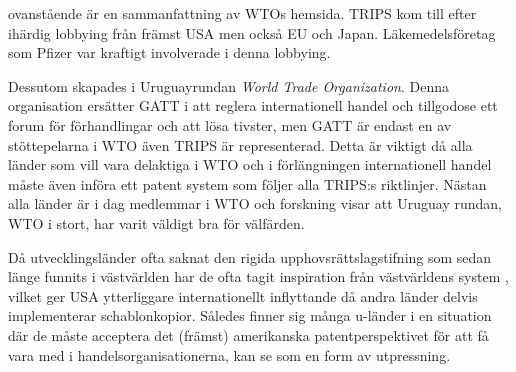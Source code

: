 ovanstående är en sammanfattning av WTOs hemsida\cite{wto}. TRIPS kom till efter ihärdig lobbying från främst USA\cite{drahos} men också EU och Japan. Läkemedelsföretag som Pfizer var kraftigt involverade i denna lobbying\cite{drahos}.


Dessutom skapades i Uruguayrundan \emph{World Trade Organization}. Denna organisation ersätter GATT i att reglera internationell handel och tillgodose ett forum för förhandlingar och att lösa tivster, men GATT är endast en av stöttepelarna i WTO även TRIPS är representerad. Detta är viktigt då alla länder som vill vara delaktiga i WTO och i förlängningen internationell handel måste även införa ett patent system som följer alla TRIPS:s riktlinjer. Nästan alla länder är i dag medlemmar i WTO och forskning visar att Uruguay rundan, WTO i stort, har varit väldigt bra för välfärden\cite{harrison}. 

Då utvecklingsländer ofta saknat den rigida upphovsrättslagstifning som sedan länge funnits i västvärlden har de ofta tagit inspiration från västvärldens system \cite{finger}, vilket ger USA ytterliggare internationellt inflyttande då andra länder delvis implementerar schablonkopior. Således finner sig många u-länder i en situation där de måste acceptera det (främst) amerikanska patentperspektivet för att få vara med i handelsorganisationerna, kan se som en form av utpressning.

